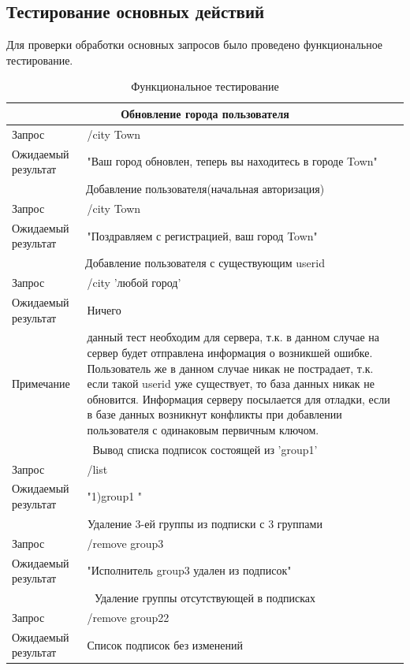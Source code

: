 \subsection{Тестирование основных действий}
Для проверки обработки основных запросов было проведено функциональное тестирование.
\begin{table} 
	\caption{Функциональное тестирование}
	\begin{center}
		\begin{tabular}{|l|p{10cm}|}
			\hline
			\multicolumn{2}{|c|}{Обновление города пользователя} \\
			\hline
			Запрос & /city Town \\
			Ожидаемый результат &  "Ваш город обновлен, теперь вы находитесь в городе Town" \\
			\hline
			\multicolumn{2}{|c|}{Добавление пользователя(начальная авторизация)} \\
			\hline
			Запрос & /city Town \\
			Ожидаемый результат &  "Поздравляем с регистрацией, ваш город Town" \\
			\hline
			\multicolumn{2}{|c|}{Добавление пользователя с существующим userid} \\
			\hline
			Запрос & /city 'любой город' \\
			Ожидаемый результат &  Ничего \\
			Примечание & данный тест необходим для сервера, т.к. в данном случае на сервер будет отправлена информация о возникшей ошибке. Пользователь же в данном случае никак не пострадает, т.к. если такой userid уже существует, то база данных никак не обновится. Информация серверу посылается для отладки, если в базе данных возникнут конфликты при добавлении пользователя с одинаковым первичным ключом. \\
			\hline
			\multicolumn{2}{|c|}{Вывод списка подписок состоящей из 'group1'} \\
			\hline
			Запрос & /list \\
			Ожидаемый результат &  "1)group1 "\\
			\hline
			\multicolumn{2}{|c|}{Удаление 3-ей группы из подписки с 3 группами} \\
			\hline
			Запрос & /remove group3 \\
			Ожидаемый результат &  "Исполнитель group3 удален из подписок" \\
			\hline
			\multicolumn{2}{|c|}{Удаление группы отсутствующей в подписках} \\
			\hline
			Запрос & /remove group22\\
			Ожидаемый результат &  Список подписок без изменений \\
			\hline

			

		\end{tabular}
	\end{center}
\end{table} 


